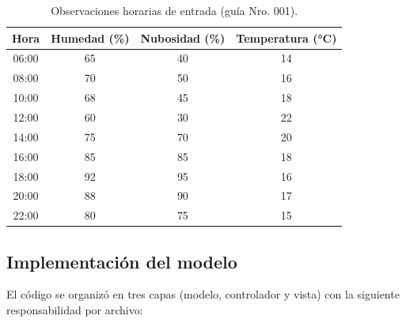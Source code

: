 \documentclass[11pt,a4paper]{article}
\begin{document}
\begin{table}[htbp]
\centering
\caption{Observaciones horarias de entrada (gu\'ia Nro. 001).}
\label{tab:datos}
\small
\begin{tabular}{cccc}
\toprule
\textbf{Hora} & \textbf{Humedad (\%)} & \textbf{Nubosidad (\%)} & \textbf{Temperatura (°C)} \\
\midrule
06:00 & 65 & 40 & 14 \\
08:00 & 70 & 50 & 16 \\
10:00 & 68 & 45 & 18 \\
12:00 & 60 & 30 & 22 \\
14:00 & 75 & 70 & 20 \\
16:00 & 85 & 85 & 18 \\
18:00 & 92 & 95 & 16 \\
20:00 & 88 & 90 & 17 \\
22:00 & 80 & 75 & 15 \\
\bottomrule
\end{tabular}
\end{table}

\subsection{Implementaci\'on del modelo}

El c\'odigo se organiz\'o en tres capas (modelo, controlador y vista) con la siguiente
responsabilidad por archivo:
\end{document}
